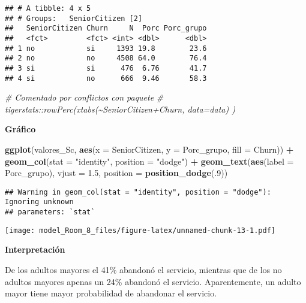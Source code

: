 \documentclass[
]{article}
\newenvironment{Shaded}{\begin{snugshade}}{\end{snugshade}}
\newcommand{\AttributeTok}[1]{\textcolor[rgb]{0.13,0.29,0.53}{#1}}
\newcommand{\CommentTok}[1]{\textcolor[rgb]{0.56,0.35,0.01}{\textit{#1}}}
\newcommand{\DecValTok}[1]{\textcolor[rgb]{0.00,0.00,0.81}{#1}}
\newcommand{\FloatTok}[1]{\textcolor[rgb]{0.00,0.00,0.81}{#1}}
\newcommand{\FunctionTok}[1]{\textcolor[rgb]{0.13,0.29,0.53}{\textbf{#1}}}
\newcommand{\NormalTok}[1]{#1}
\newcommand{\SpecialCharTok}[1]{\textcolor[rgb]{0.81,0.36,0.00}{\textbf{#1}}}
\newcommand{\StringTok}[1]{\textcolor[rgb]{0.31,0.60,0.02}{#1}}
\begin{document}
\begin{verbatim}
## # A tibble: 4 x 5
## # Groups:   SeniorCitizen [2]
##   SeniorCitizen Churn     N  Porc Porc_grupo
##   <fct>         <fct> <int> <dbl>      <dbl>
## 1 no            si     1393 19.8        23.6
## 2 no            no     4508 64.0        76.4
## 3 si            si      476  6.76       41.7
## 4 si            no      666  9.46       58.3
\end{verbatim}

\begin{Shaded}
\begin{Highlighting}[]
\CommentTok{\# Comentado por conflictos con paquete}
\CommentTok{\# tigerstats::rowPerc(xtabs(\textasciitilde{}SeniorCitizen+Churn, data=data) )}
\end{Highlighting}
\end{Shaded}

\textbf{Gráfico}

\begin{Shaded}
\begin{Highlighting}[]
\FunctionTok{ggplot}\NormalTok{(valores\_Sc, }\FunctionTok{aes}\NormalTok{(}\AttributeTok{x =}\NormalTok{ SeniorCitizen, }\AttributeTok{y =}\NormalTok{ Porc\_grupo, }\AttributeTok{fill =}\NormalTok{ Churn)) }\SpecialCharTok{+}
  \FunctionTok{geom\_col}\NormalTok{(}\AttributeTok{stat =} \StringTok{"identity"}\NormalTok{, }\AttributeTok{position =} \StringTok{"dodge"}\NormalTok{) }\SpecialCharTok{+}
  \FunctionTok{geom\_text}\NormalTok{(}\FunctionTok{aes}\NormalTok{(}\AttributeTok{label =}\NormalTok{ Porc\_grupo), }\AttributeTok{vjust =} \FloatTok{1.5}\NormalTok{,}
            \AttributeTok{position =} \FunctionTok{position\_dodge}\NormalTok{(.}\DecValTok{9}\NormalTok{))}
\end{Highlighting}
\end{Shaded}

\begin{verbatim}
## Warning in geom_col(stat = "identity", position = "dodge"): Ignoring unknown
## parameters: `stat`
\end{verbatim}

\texttt{[image: model\_Room\_8\_files/figure-latex/unnamed-chunk-13-1.pdf]}

\textbf{Interpretación}

De los adultos mayores el 41\% abandonó el servicio, mientras que de los
no adultos mayores apenas un 24\% abandonó el servicio. Aparentemente,
un adulto mayor tiene mayor probabilidad de abandonar el servicio.
\end{document}
